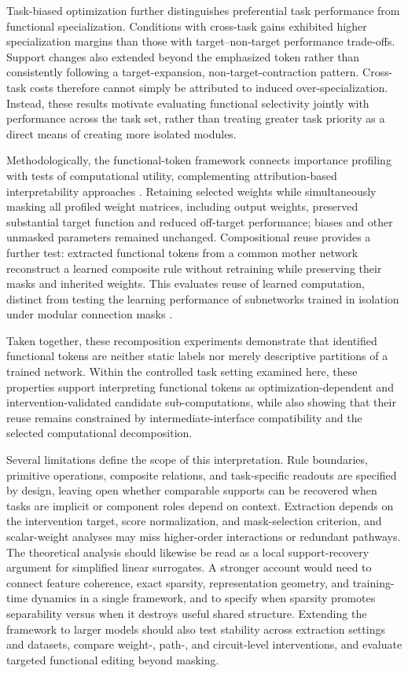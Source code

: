 \documentclass{article}
\begin{document}
Task-biased optimization further distinguishes preferential task performance from functional specialization. Conditions with cross-task gains exhibited higher specialization margins than those with target--non-target performance trade-offs. Support changes also extended beyond the emphasized token rather than consistently following a target-expansion, non-target-contraction pattern. Cross-task costs therefore cannot simply be attributed to induced over-specialization. Instead, these results motivate evaluating functional selectivity jointly with performance across the task set, rather than treating greater task priority as a direct means of creating more isolated modules.

Methodologically, the functional-token framework connects importance profiling with tests of computational utility, complementing attribution-based interpretability approaches \cite{marcinkevicsInterpretableExplainableMachine2023,michaudOpeningAIBlack2024}. Retaining selected weights while simultaneously masking all profiled weight matrices, including output weights, preserved substantial target function and reduced off-target performance; biases and other unmasked parameters remained unchanged. Compositional reuse provides a further test: extracted functional tokens from a common mother network reconstruct a learned composite rule without retraining while preserving their masks and inherited weights. This evaluates reuse of learned computation, distinct from testing the learning performance of subnetworks trained in isolation under modular connection masks \cite{wu2026taskstructured}.

Taken together, these recomposition experiments demonstrate that identified functional tokens are neither static labels nor merely descriptive partitions of a trained network. Within the controlled task setting examined here, these properties support interpreting functional tokens as optimization-dependent and intervention-validated candidate sub-computations, while also showing that their reuse remains constrained by intermediate-interface compatibility and the selected computational decomposition.

Several limitations define the scope of this interpretation. Rule boundaries, primitive operations, composite relations, and task-specific readouts are specified by design, leaving open whether comparable supports can be recovered when tasks are implicit or component roles depend on context. Extraction depends on the intervention target, score normalization, and mask-selection criterion, and scalar-weight analyses may miss higher-order interactions or redundant pathways. The theoretical analysis should likewise be read as a local support-recovery argument for simplified linear surrogates. A stronger account would need to connect feature coherence, exact sparsity, representation geometry, and training-time dynamics in a single framework, and to specify when sparsity promotes separability versus when it destroys useful shared structure. Extending the framework to larger models should also test stability across extraction settings and datasets, compare weight-, path-, and circuit-level interventions, and evaluate targeted functional editing beyond masking.
\end{document}
